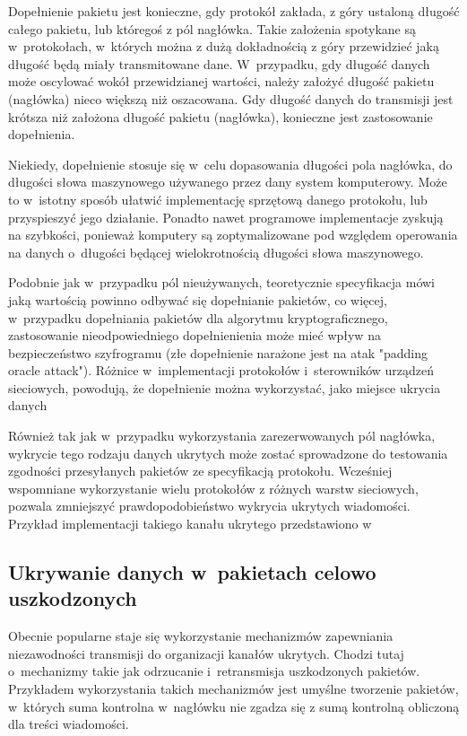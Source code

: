 \documentclass[a4paper, twoside, 12pt]{report}
\begin{document}
        Dopełnienie pakietu jest konieczne, gdy protokół zakłada, z góry ustaloną długość
        całego pakietu, lub któregoś z pól nagłówka. Takie założenia spotykane są
        w~protokołach, w~których można z dużą dokładnością z góry przewidzieć jaką długość
        będą miały transmitowane dane. W~przypadku, gdy długość danych może oscylować
        wokół przewidzianej wartości, należy założyć długość pakietu (nagłówka)
        nieco większą niż oszacowana. Gdy długość danych do transmisji jest krótsza niż
        założona długość pakietu (nagłówka), konieczne jest zastosowanie dopełnienia.

        Niekiedy, dopełnienie stosuje się w~celu dopasowania długości pola nagłówka,
        do długości słowa maszynowego używanego przez dany system komputerowy. Może
        to w~istotny sposób ułatwić implementację sprzętową danego protokołu, lub
        przyspieszyć jego działanie. Ponadto nawet programowe implementacje zyskują
        na szybkości, ponieważ komputery są zoptymalizowane pod względem operowania
        na danych o~długości będącej wielokrotnością długości słowa maszynowego.

        Podobnie jak w~przypadku pól nieużywanych, teoretycznie specyfikacja
        mówi jaką wartością powinno odbywać się dopełnianie pakietów, co więcej,
        w~przypadku dopełniania pakietów dla algorytmu kryptograficznego, zastosowanie
        nieodpowiedniego dopełnienienia może mieć wpływ na bezpieczeństwo szyfrogramu (złe dopełnienie narażone
        jest na atak "padding oracle attack"). Różnice w~implementacji protokołów
        i~sterowników urządzeń sieciowych, powodują, że dopełnienie można wykorzystać,
        jako miejsce ukrycia danych\cite{PADSTEG}

        Również tak jak w~przypadku wykorzystania zarezerwowanych pól nagłówka,
        wykrycie tego rodzaju danych ukrytych może zostać sprowadzone do testowania
        zgodności przesyłanych pakietów ze specyfikacją protokołu. Wcześniej wspomniane
        wykorzystanie wielu protokołów z różnych warstw sieciowych, pozwala zmniejszyć
        prawdopodobieństwo wykrycia ukrytych wiadomości. Przykład implementacji
        takiego kanału ukrytego przedstawiono w~\cite{PADSTEG}

        \subsection{Ukrywanie danych w~pakietach celowo uszkodzonych} \label{USZKODZONEPAKIETY}
        Obecnie popularne staje się wykorzystanie mechanizmów zapewniania niezawodności
        transmisji do organizacji kanałów ukrytych. Chodzi tutaj o~mechanizmy
        takie jak odrzucanie i~retransmisja uszkodzonych pakietów. Przykładem wykorzystania takich
        mechanizmów jest umyślne tworzenie pakietów, w~których suma kontrolna w~nagłówku
        nie zgadza się z sumą kontrolną obliczoną dla treści wiadomości.
\end{document}

